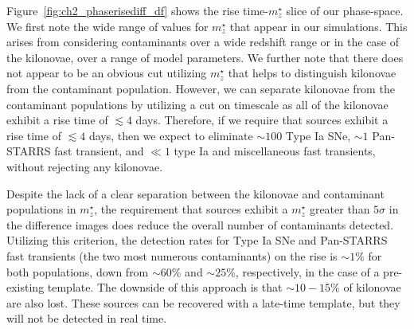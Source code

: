 Figure~\ref{fig:ch2_phaserisediff_df} shows the rise time-$m^{\star}_z$ slice of our phase-space. We first note the wide range of values for $m^{\star}_z$ that appear in our simulations. This arises from considering contaminants over a wide redshift range or in the case of the kilonovae, over a range of model parameters. We further note that there does not appear to be an obvious cut utilizing $m^{\star}_z$ that helps to distinguish kilonovae from the contaminant population. However, we can separate kilonovae from the contaminant populations by utilizing a cut on timescale as all of the kilonovae exhibit a rise time of $\lesssim 4$ days. Therefore, if we require that sources exhibit a rise time of $\lesssim 4$ days, then we expect to eliminate $\sim 100$ Type Ia SNe, $\sim 1$ Pan-STARRS fast transient, and $\ll1$ type Ia and miscellaneous fast transients, without rejecting any kilonovae.

Despite the lack of a clear separation between the kilonovae and contaminant populations in $m^{\star}_z$, the requirement that sources exhibit a $m^{\star}_z$ greater than $5\sigma$ in the difference images does reduce the overall number of contaminants detected. Utilizing this criterion, the detection rates for Type Ia SNe and Pan-STARRS fast transients (the two most numerous contaminants) on the rise is $\sim1\%$ for both populations, down from $\sim60\%$ and $\sim25\%$, respectively, in the case of a pre-existing template. The downside of this approach is that $\sim10-15\%$ of kilonovae are also lost. These sources can be recovered with a late-time template, but they will not be detected in real time.


